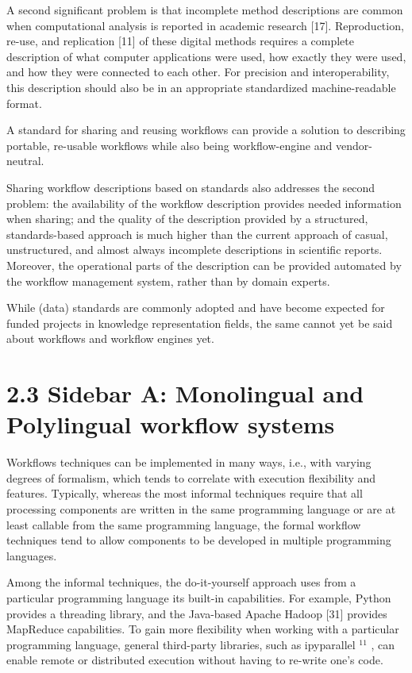 \documentclass[
]{article}
\begin{document}
A second significant problem is that incomplete method descriptions are
common when computational analysis is reported in academic research
{[}17{]}. Reproduction, re-use, and replication {[}11{]} of these
digital methods requires a complete description of what computer
applications were used, how exactly they were used, and how they were
connected to each other. For precision and interoperability, this
description should also be in an appropriate standardized
machine-readable format.

A standard for sharing and reusing workflows can provide a solution to
describing portable, re-usable workflows while also being
workflow-engine and vendor-neutral.

Sharing workflow descriptions based on standards also addresses the
second problem: the availability of the workflow description provides
needed information when sharing; and the quality of the description
provided by a structured, standards-based approach is much higher than
the current approach of casual, unstructured, and almost always
incomplete descriptions in scientific reports. Moreover, the operational
parts of the description can be provided automated by the workflow
management system, rather than by domain experts.

While (data) standards are commonly adopted and have become expected for
funded projects in knowledge representation fields, the same cannot yet
be said about workflows and workflow engines yet.

\section{2.3 Sidebar A: Monolingual and Polylingual workflow
systems}\label{sidebar-a-monolingual-and-polylingual-workflow-systems}

Workflows techniques can be implemented in many ways, i.e., with varying
degrees of formalism, which tends to correlate with execution
flexibility and features. Typically, whereas the most informal
techniques require that all processing components are written in the
same programming language or are at least callable from the same
programming language, the formal workflow techniques tend to allow
components to be developed in multiple programming languages.

Among the informal techniques, the do-it-yourself approach uses from a
particular programming language its built-in capabilities. For example,
Python provides a threading library, and the Java-based Apache Hadoop
{[}31{]} provides MapReduce capabilities. To gain more flexibility when
working with a particular programming language, general third-party
libraries, such as ipyparallel \(^{11}\) , can enable remote or
distributed execution without having to re-write one's code.
\end{document}
